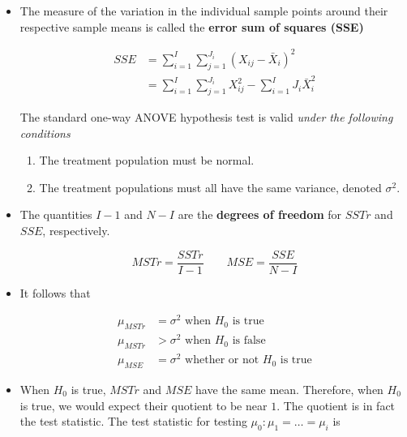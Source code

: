 \documentclass[9pt,landscape]{memoir}
\begin{document}
\begin{multicols}{3}
\begin{itemize}
        \item The measure of the variation in the individual sample points around their respective sample means is called the \textbf{error sum of squares (SSE)}

            \begin{align*}
                SSE &= \sum_{i = 1} ^I \sum_{j = 1} ^{J_i} {(X_{ij} - \bar{X}_i)}^2 \\
                    &= \sum _{i = 1} ^I \sum _{j = 1} ^{J_i} X_{ij} ^2 - \sum _{i = 1} ^I J_i \bar{X}_i ^2
            \end{align*}

            The standard one-way ANOVE hypothesis test is valid \textit{under the following conditions}

            \begin{enumerate}
                \item The treatment population must be normal.
                \item The treatment populations must all have the same variance, denoted $\sigma ^2$.
            \end{enumerate}


            \vspace{2mm}
        \item The quantities $I - 1$ and $N - I$ are the \textbf{degrees of freedom} for $SSTr$ and $SSE$, respectively.

            \begin{equation*}
                MSTr = \frac{SSTr}{I - 1} \qquad MSE = \frac{SSE}{N - I}
            \end{equation*}

        \item It follows that

            \begin{align*}
                \mu_{MSTr} &= \sigma^2 \text{ when $H_0$ is true} \\
                \mu_{MSTr} &> \sigma^2 \text{ when $H_0$ is false} \\
                \mu_{MSE} &= \sigma^2 \text{ whether or not $H_0$ is true}
            \end{align*}

        \item When $H_0$ is true, $MSTr$ and $MSE$ have the same mean. Therefore, when $H_0$ is true, we would expect their quotient to be near $1$. The quotient is in fact the test statistic. The test statistic for testing $\mu_0: \mu_1 = \ldots = \mu_i$ is


\end{itemize}
\end{multicols}
\end{document}
